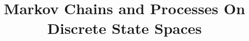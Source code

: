 % 

% 
% 

\documentclass{ximera}

\title{Markov Chains and Processes On Discrete State Spaces}

\begin{abstract}
\end{abstract}
\maketitle
\begin{theorem}[5.2 Rules for Exponents]
For any numbers $b$, $c$, $x$, and $y$ for which the expressions that follow are defined,
\begin{multicols}{3}
\begin{enumerate}[label=(\alph*)]
\item $\displaystyle b^{x+y} = b^xb^y$
\item $\displaystyle (bc)^x = b^xc^x$
\item $\displaystyle b^{xy} = (b^x)^y = (b^y)^x$
\item $\displaystyle b^{x-y} = $
\item $\left(  \right)^x = $
\item $\displaystyle b^{x/y} = (b^x)^{1/y} = (b^{1/y})^x$
\end{enumerate}
\end{multicols}
\end{theorem}
